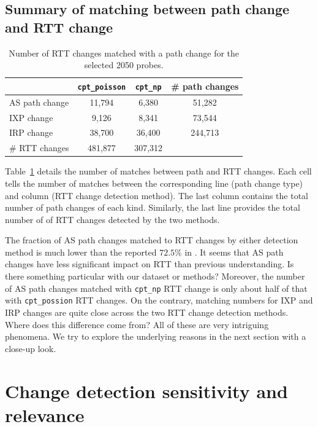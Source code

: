 \subsection{Summary of matching between path change and RTT change}

\begin{table}[!htb]
\caption{Number of RTT changes matched with a path change for the selected 2050 probes.}
\label{tab:corr_overview}
\centering
\footnotesize
\setlength{\tabcolsep}{0.5em}
\begin{tabular}{l|cc|c}
\toprule
& \texttt{cpt\_poisson} & \texttt{cpt\_np} & \# path changes\\
\midrule
AS path change & 11,794 & 6,380 & 51,282 \\
IXP change & 9,126 & 8,341 & 73,544\\
IRP change & 38,700 & 36,400 & 244,713\\
\midrule
\# RTT changes & 481,877 & 307,312 & \\
\bottomrule
\end{tabular}
\end{table}
Table~\ref{tab:corr_overview} details the number of matches between path and RTT changes.
Each cell tells the number of matches between the corresponding line (path change type) and column (RTT change detection method).
The last column contains the total number of path changes of each kind.
Similarly, the last line provides the total number of of RTT changes detected by the two methods.

The fraction of AS path changes matched to RTT changes by either detection method is much lower than the reported $72.5\%$ in \cite{Rimondini2014}.
It seems that AS path changes have less significant impact on RTT than previous understanding.
Is there something particular with our dataset or methods?
Moreover, the number of AS path changes matched with \texttt{cpt\_np} RTT change is only about half of that with \texttt{cpt\_possion} RTT changes.
On the contrary, matching numbers for IXP and \ac{IRP} changes are quite close across the two RTT change detection methods.
Where does this difference come from?
All of these are very intriguing phenomena.
We try to explore the underlying reasons in the next section with a close-up look.

\section{Change detection sensitivity and relevance}
